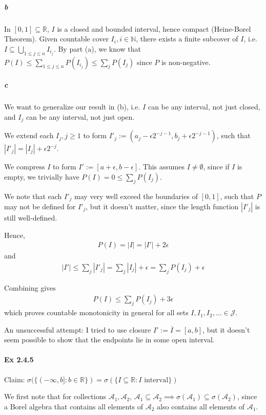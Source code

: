 \documentclass[a4paper]{article}
\begin{document}
\subparagraph{b}
In $[0,1]\subseteq \mathbb{R}$, $I$ is a closed and bounded interval, hence compact (Heine-Borel Theorem). Given countable cover $I_i, i\in \mathbb{N}$, there exists a finite subcover of $I$, i.e. $I\subseteq \bigcup_{1\leq j\leq n}I_{i_j}$. By part (a), we know that $P(I)\leq \sum_{1\leq j\leq n}P(I_{i_j})\leq \sum_{j}P(I_j)$ since $P$ is non-negative.

\subparagraph{c} We want to generalize our result in (b), i.e. $I$ can be any interval, not just closed, and $I_j$ can be any interval, not just open.

We extend each $I_j, j\geq 1$ to form $I'_j := (a_j - \epsilon 2^{-j-1}, b_j + \epsilon 2^{-j-1})$, such that $|I'_j| = |I_j| + \epsilon2^{-j}$.

We compress $I$ to form $I':=[a+\epsilon, b-\epsilon]$. This assumes $I\neq \emptyset$, since if $I$ is empty, we trivially have $P(I)=0\leq \sum_j P(I_j)$.

We note that each $I'_j$ may very well exceed the boundaries of $[0,1]$, such that $P$ may not be defined for $I'_j$, but it doesn't matter, since the length function $|I'_j|$ is still well-defined.

Hence, \begin{align*}
	P(I) = |I| = |I'| + 2\epsilon
\end{align*}
and 
\begin{align*}
	|I'|\leq \sum_{j} |I'_j| = \sum_{j} |I_j| + \epsilon = \sum_{j} P(I_j) + \epsilon
\end{align*}

Combining gives
\begin{align*}
	P(I)\leq \sum_{j} P(I_j) + 3\epsilon
\end{align*}
which proves countable monotonicity in general for all sets $I, I_1, I_2,\dots \in \mathcal{J}$.


An unsuccessful attempt: I tried to use closure $I' := \overline{I} = [a,b]$, but it doesn't seem possible to show that the endpoints lie in some open interval.

\paragraph{Ex 2.4.5} Claim: $\sigma(\{(-\infty, b] : b\in \mathbb{R}\}) = \sigma(\{I\subseteq \mathbb{R}:I \text{ interval}\})$

We first note that for collections $\mathcal{A_1}, \mathcal{A_2}$, $\mathcal{A_1}\subseteq \mathcal{A_2}\implies \sigma(\mathcal{A_1})\subseteq \sigma(\mathcal{A_2})$, since a Borel algebra that contains all elements of $\mathcal{A_2}$ also contains all elements of $\mathcal{A_1}$.
\end{document}
